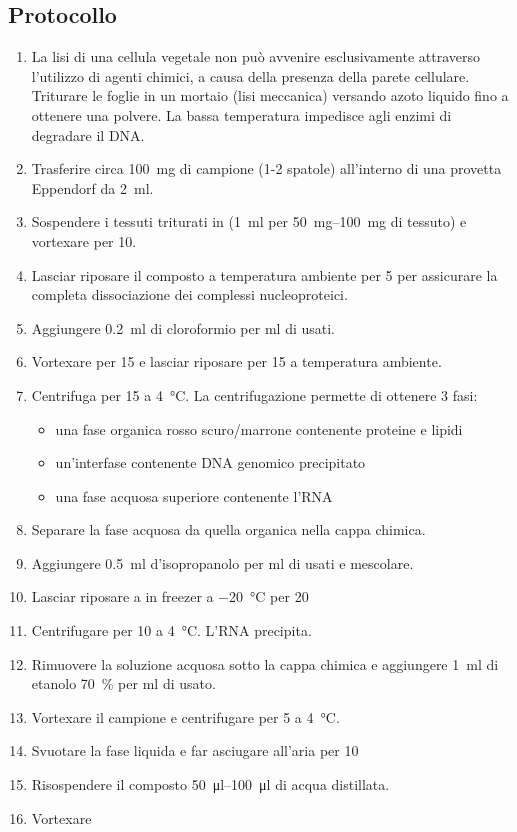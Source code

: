 \subsection{Protocollo}
\begin{enumerate}
	\item La lisi di una cellula vegetale non può avvenire esclusivamente attraverso l’utilizzo di agenti chimici, a causa della presenza della parete cellulare. Triturare le foglie in un mortaio (lisi meccanica) versando azoto liquido fino a ottenere una polvere. La bassa temperatura impedisce agli enzimi di degradare il DNA.
	\item Trasferire circa \qty{100}{\mg} di campione (1-2 spatole) all’interno di una provetta \foreignlanguage{german}{Eppendorf} da \qty{2}{\ml}.
	\item Sospendere i tessuti triturati in \trizol (\qty{1}{ml} per \qtyrange{50}{100}{mg} di tessuto) e vortexare per \qty{10}{\sec}.
	\item Lasciar riposare il composto a temperatura ambiente per \qty{5}{\min} per assicurare la completa dissociazione dei complessi nucleoproteici.
	\item Aggiungere \qty{0.2}{\ml} di cloroformio per ml di \trizol usati.
	\item Vortexare per \qty{15}{\sec} e lasciar riposare per \qty{15}{\min} a temperatura ambiente.
	\item Centrifuga per \qty{15}{\min} a \qty{4}{\celsius}. La centrifugazione permette di ottenere 3 fasi: 
	\begin{itemize}
		\item una fase organica rosso scuro/marrone contenente proteine e lipidi
		\item un’interfase contenente DNA genomico precipitato
		\item una fase acquosa superiore contenente l’RNA
	\end{itemize}
	\item Separare la fase acquosa da quella organica nella cappa chimica.
	\item Aggiungere \qty{0.5}{ml} d'isopropanolo per \unit{\ml} di \trizol usati e mescolare.
	\item Lasciar riposare a in freezer a \qty{-20}{\celsius} per \qty{20}{\min}
	\item Centrifugare per \qty{10}{\min} a \qty{4}{\celsius}. L’RNA precipita.
	\item Rimuovere la soluzione acquosa sotto la cappa chimica e aggiungere \qty{1}{ml} di etanolo \qty{70}{\percent} per \unit{\ml} di \trizol usato.
	\item Vortexare il campione e centrifugare per \qty{5}{\min} a \qty{4}{\celsius}.
	\item Svuotare la fase liquida e far asciugare all’aria per \qty{10}{\min}
	\item Risospendere il composto \qtyrange{50}{100}{\micro\litre} di acqua distillata.
	\item Vortexare	
\end{enumerate}


